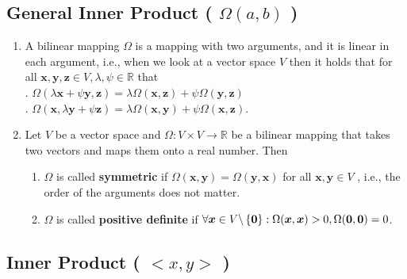 \subsection{General Inner Product ( $\Omega(a, b)$ )}

\begin{enumerate}
    \item A bilinear mapping $\Omega$ is a mapping with two arguments, and it is linear in each argument, i.e., when we look at a vector space $V$ then it holds that for all $\bm{x}, \bm{y}, \bm{z} \in V, \lambda , \psi  \in \mathbb{R}$ that
    \hfill \cite{mfml/book/mml/Deisenroth-Faisal-Ong}
    \\
    .\hfill
    $\Omega(\lambda \bm{x} + \psi \bm{y}, \bm{z}) = \lambda \Omega(\bm{x}, \bm{z}) + \psi \Omega(\bm{y}, \bm{z})$
    \hfill \cite{mfml/book/mml/Deisenroth-Faisal-Ong}
    \\
    .\hfill
    $\Omega(\bm{x}, \lambda \bm{y} + \psi \bm{z}) = \lambda \Omega(\bm{x}, \bm{y}) + \psi \Omega(\bm{x}, \bm{z})$.
    \hfill \cite{mfml/book/mml/Deisenroth-Faisal-Ong}

    \item Let $V$ be a vector space and $\Omega : V \times  V \to \mathbb{R}$ be a bilinear mapping that takes two vectors and maps them onto a real number. Then
    \hfill \cite{mfml/book/mml/Deisenroth-Faisal-Ong}
    \begin{enumerate}
        \item $\Omega$ is called \textbf{symmetric} if $\Omega(\bm{x}, \bm{y}) = \Omega(\bm{y}, \bm{x})$ for all $\bm{x}, \bm{y} \in  V$ , i.e., the order of the arguments does not matter.
        \hfill \cite{mfml/book/mml/Deisenroth-Faisal-Ong}

        \item $\Omega$ is called \textbf{positive definite} if $\forall \bm{x} \in  V \backslash \left\{\bm{0}\right\} : \Omega(\bm{x}, \bm{x}) > 0 , \Omega(\bm{0}, \bm{0}) = 0$.
        \hfill \cite{mfml/book/mml/Deisenroth-Faisal-Ong}
    \end{enumerate}

\end{enumerate}





\subsection{Inner Product ( $<x, y>$ )}

